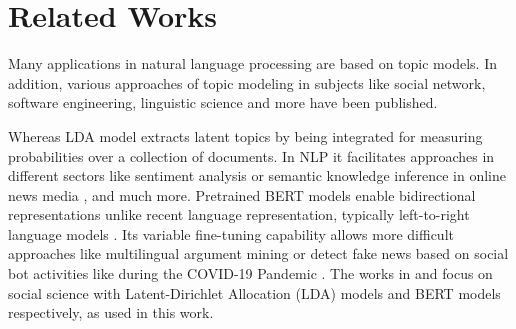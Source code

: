 \section{Related Works}\label{sec:related_works}
Many applications in natural language processing are based on topic models. In addition, various approaches of topic modeling in subjects like social network, software engineering, linguistic science and more have been published. 

Whereas LDA model extracts latent topics by being integrated for measuring probabilities over a collection of documents. In NLP it facilitates approaches in different sectors like sentiment analysis or semantic knowledge inference in online news media \cite{6033626}, and much more. Pretrained BERT models enable bidirectional representations unlike recent language representation, typically left-to-right language models \cite{DevlinPres}. Its variable fine-tuning capability allows more difficult approaches like multilingual argument mining \cite{toledo2020multilingual} or detect fake news based on social bot activities like during the COVID-19 Pandemic \cite{9666618}.
The works in \citet{zirn2014multidimensional} and \citet{koh2021predicting} focus on social science with Latent-Dirichlet Allocation (LDA) models and BERT models respectively, as used in this work. 

